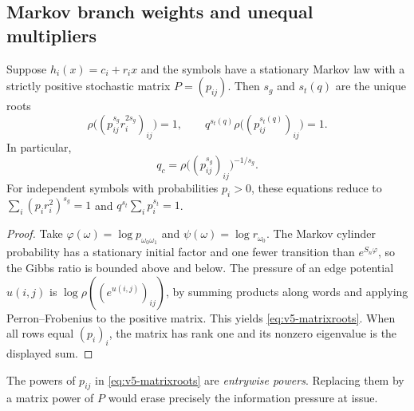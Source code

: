 \subsection{Markov branch weights and unequal multipliers}
\begin{corollary}\label{cor:v5-markov}
Suppose $h_i(x)=c_i+r_ix$ and the symbols have a stationary Markov
law with a strictly positive stochastic matrix $P=(p_{ij})$.
Then $s_g$ and $s_t(q)$ are the unique roots
\begin{equation}\label{eq:v5-matrixroots}
 \rho\bigl((p_{ij}^{s_g}r_i^{2s_g})_{ij}\bigr)=1,
 \qquad q^{s_t(q)}\rho\bigl((p_{ij}^{s_t(q)})_{ij}\bigr)=1.
\end{equation}
In particular,
\[
 q_c=\rho\bigl((p_{ij}^{s_g})_{ij}\bigr)^{-1/s_g}.
\]
For independent symbols with probabilities $p_i>0$, these equations
reduce to $\sum_i(p_ir_i^2)^{s_g}=1$ and
$q^{s_t}\sum_i p_i^{s_t}=1$.
\end{corollary}

\begin{proof}
Take $\varphi(\omega)=\log p_{\omega_0\omega_1}$ and
$\psi(\omega)=\log r_{\omega_0}$. The Markov cylinder probability
has a stationary initial factor and one fewer transition than
$e^{S_n\varphi}$, so the Gibbs ratio is bounded above and below.
The pressure of an edge potential $u(i,j)$ is
$\log\rho((e^{u(i,j)})_{ij})$, by summing products along words
and applying Perron--Frobenius to the positive matrix. This yields
\eqref{eq:v5-matrixroots}. When all rows equal $(p_i)_i$, the
matrix has rank one and its nonzero eigenvalue is the displayed
sum.
\end{proof}

The powers of $p_{ij}$ in \eqref{eq:v5-matrixroots} are
\emph{entrywise powers}. Replacing them by a matrix power of $P$
would erase precisely the information pressure at issue.

